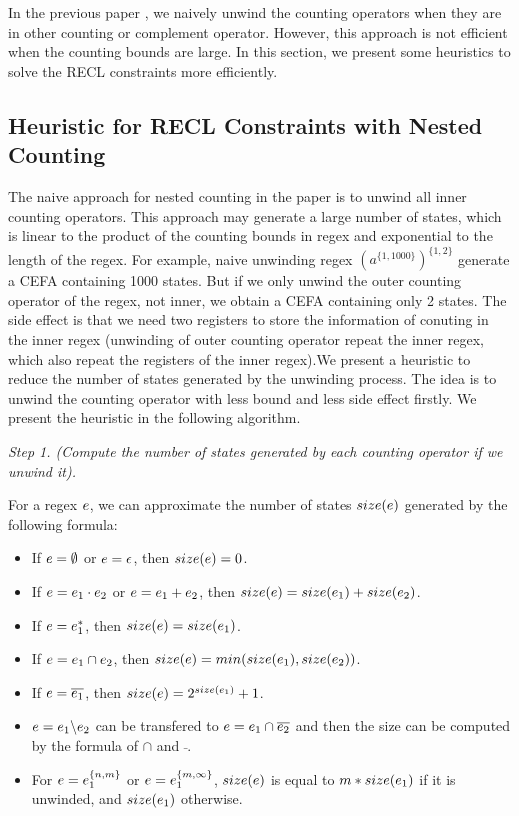 In the previous paper \cite{Denghang2023}, we naively unwind the counting operators when they are in other counting or complement operator. However, this approach is not efficient when the counting bounds are large. In this section, we present some heuristics to solve the RECL constraints more efficiently.

\subsection{Heuristic for RECL Constraints with Nested Counting}\label{heuristic:nested}
 The naive approach for nested counting in the paper \cite{Denghang2023} is to unwind all inner counting operators. This approach may generate a large number of states, which is linear to the product of the counting bounds in regex and exponential to the length of the regex. For example, naive unwinding regex $(a^{\{1,1000\}})^{\{1,2\}}$ generate a CEFA containing 1000 states. But if we only unwind the outer counting operator of the regex, not inner, we obtain a CEFA containing only 2 states. The side effect is that we need two registers to store the information of conuting in the inner regex (unwinding of outer counting operator repeat the inner regex, which also repeat the registers of the inner regex).We present a heuristic to reduce the number of states generated by the unwinding process. The idea is to unwind the counting operator with less bound and less side effect firstly. We present the heuristic in the following algorithm.

\medskip
\noindent
\emph{Step 1. (Compute the number of states generated by each counting operator if we unwind it).}

For a regex $e$, we can approximate the number of states $size(e)$ generated by the following formula: 
\begin{itemize}
  \item If $e = \emptyset$ or $e = \epsilon$, then $size(e) = 0$. 
  \item If $e = e_1 \cdot e_2$ or $e = e_1 + e_2$, then $size(e) = size(e_1) + size(e_2)$.
  \item If $e = e_1^*$, then $size(e) = size(e_1)$.
  \item If $e = e_1 \cap e_2$, then $size(e) = min(size(e_1), size(e_2))$.
  \item If $e = \overline{e_1}$, then $size(e) = 2^{size(e_1)} + 1$.
  \item $e = e_1 \backslash e_2$ can be transfered to $e = e_1 \cap \overline{e_2}$ and then the size can be computed by the formula of $\cap$ and $\bar{}$.
  \item For $e = e_1^{\{n,m\}}$ or $e = e_1^{\{m,\infty\}}$, $size(e)$ is equal to $m*size(e_1)$ if it is unwinded, and $size(e_1)$ otherwise.
\end{itemize}

